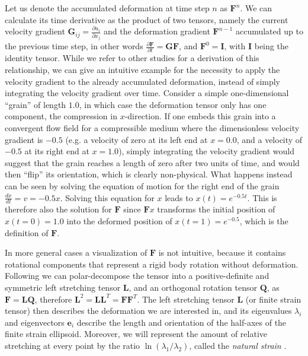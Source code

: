 \documentclass{article}
\begin{document}
Let us denote the accumulated deformation at time step $n$ as $\mathbf F^n$. We can calculate its time derivative  
as the product of two tensors, namely the current velocity gradient $\mathbf G_{ij} = \frac{\partial u_i}{\partial x_j}$ and the deformation gradient $\mathbf F^{n-1}$ accumulated up to the previous time step, in other words $\frac{\partial \mathbf F}{\partial t} = \mathbf G \mathbf F$, and $\mathbf F^0 = \mathbf I$, with $\mathbf I$ being the identity tensor.
While we refer to other studies \cite{McKenzie1983, dahlen1998theoretical, Becker2003} for a derivation of
this relationship, we can give an intuitive example for the necessity to apply the velocity gradient to the already accumulated deformation, instead of simply integrating the velocity gradient over time. Consider a simple one-dimensional ``grain'' of length $1.0$, in which case the deformation tensor only has one component, the compression in $x$-direction. If one embeds this grain into a convergent flow field for a compressible medium where the dimensionless velocity gradient is $-0.5$  (e.g. a velocity of zero at its left end at $x=0.0$, and a velocity of $-0.5$ at its right end at $x=1.0$), simply integrating the velocity gradient would suggest that the grain reaches a length of zero after two units of time, and would then ``flip'' its orientation, which is clearly non-physical.
What happens instead can be seen by solving the equation of motion for the right end of the grain $\frac{dx}{dt} = v = -0.5 x$. Solving this equation for $x$ leads to $x(t) = e^{-0.5t}$. This is therefore also the solution for $\mathbf F$ since $\mathbf F x$ transforms the initial position of $x(t=0)=1.0$ into the deformed position of $x(t=1) = e^{-0.5}$, which is the definition of $\mathbf F$.

In more general cases a visualization of $\mathbf F$ is not intuitive, because it contains rotational components that represent a rigid body rotation without deformation. Following \cite{Becker2003} we can polar-decompose the tensor into a positive-definite and symmetric left stretching tensor $\mathbf L$, and an orthogonal rotation tensor $\mathbf Q$, as $\mathbf F = \mathbf L \mathbf Q$, therefore $\mathbf L^2 = \mathbf L \mathbf L^T = \mathbf F \mathbf F^T$. The left stretching tensor $\mathbf L$ (or finite strain tensor) then describes the deformation we are interested in, and its eigenvalues $\lambda_i$ and eigenvectors $\mathbf e_i$ describe the length and orientation of the half-axes of the finite strain ellipsoid. Moreover, we will represent the amount of relative stretching at every point by the ratio $\ln(\lambda_1/\lambda_2)$, called the \textit{natural strain} \cite{Ribe1992}.
\end{document}
